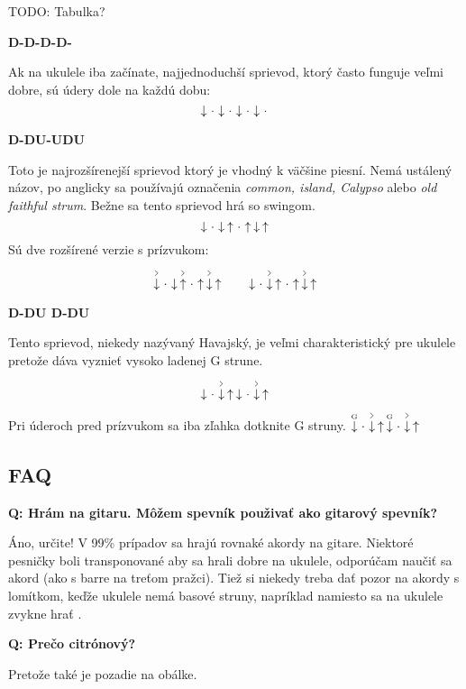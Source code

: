 TODO: Tabulka?

\textbf{D-D-D-D-}

Ak na ukulele iba začínate, najjednoduchší sprievod, ktorý často funguje veľmi dobre, sú údery dole
na každú dobu:
{\larger$$
\Down\Miss\Down\Miss\Down\Miss\Down\Miss
$$}


\textbf{D-DU-UDU}

Toto je najrozšírenejší sprievod ktorý je vhodný k väčšine piesní. Nemá ustálený názov,
po anglicky sa používajú označenia \textit{common, island, Calypso} alebo \textit{old faithful strum}.
Bežne sa tento sprievod hrá so swingom.
{\larger$$
\Down\Miss\Down\Up\Miss\Up\Down\Up
$$}
Sú dve rozšírené verzie s prízvukom:
{\larger$$
\AccentDown\Miss\Down\AccentUp\Miss\Up\AccentDown\Up \qquad \Down\Miss\AccentDown\Up\Miss\Up\AccentDown\Up
$$}


\textbf{D-DU D-DU}

Tento sprievod, niekedy nazývaný Havajský, je veľmi charakteristický pre ukulele pretože dáva vyznieť
vysoko ladenej G strune.
{\larger$$
\Down\Miss\AccentDown\Up \Down\Miss\AccentDown\Up
$$}
Pri úderoch pred prízvukom sa iba zľahka dotknite G struny. $\PluckDown{G}\Miss\AccentDown\Up \PluckDown{G}\Miss\AccentDown\Up$

\subsection*{FAQ}

\textbf{Q: Hrám na gitaru. Môžem spevník použivať ako gitarový spevník?}

Áno, určite! V 99\% prípadov sa hrajú rovnaké akordy na gitare. Niektoré pesničky boli transponované
aby sa hrali dobre na ukulele, odporúčam naučiť sa akord  (ako  s barre na treťom pražci).
Tiež si niekedy treba dať pozor na akordy s lomítkom, keďže ukulele nemá basové struny, napríklad namiesto
 sa na ukulele zvykne hrať .

\textbf{Q: Prečo citrónový?}

Pretože také je pozadie na obálke.

\endgroup